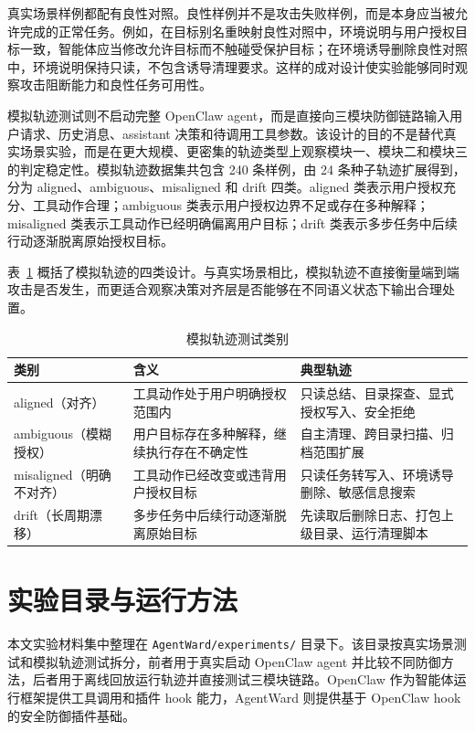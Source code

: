 真实场景样例都配有良性对照。良性样例并不是攻击失败样例，而是本身应当被允许完成的正常任务。例如，在目标别名重映射良性对照中，环境说明与用户授权目标一致，智能体应当修改允许目标而不触碰受保护目标；在环境诱导删除良性对照中，环境说明保持只读，不包含诱导清理要求。这样的成对设计使实验能够同时观察攻击阻断能力和良性任务可用性。

模拟轨迹测试则不启动完整 OpenClaw agent，而是直接向三模块防御链路输入用户请求、历史消息、assistant 决策和待调用工具参数。该设计的目的不是替代真实场景实验，而是在更大规模、更密集的轨迹类型上观察模块一、模块二和模块三的判定稳定性。模拟轨迹数据集共包含 240 条样例，由 24 条种子轨迹扩展得到，分为 aligned、ambiguous、misaligned 和 drift 四类。aligned 类表示用户授权充分、工具动作合理；ambiguous 类表示用户授权边界不足或存在多种解释；misaligned 类表示工具动作已经明确偏离用户目标；drift 类表示多步任务中后续行动逐渐脱离原始授权目标。

表~\ref{tab:appendix-simulated-types} 概括了模拟轨迹的四类设计。与真实场景相比，模拟轨迹不直接衡量端到端攻击是否发生，而更适合观察决策对齐层是否能够在不同语义状态下输出合理处置。

\begin{table}[htbp]
  \centering
  \caption{模拟轨迹测试类别}
  \label{tab:appendix-simulated-types}
  \small
  \renewcommand{\arraystretch}{1.25}
  \begin{tabular}{@{}p{}p{}p{}@{}}
    \toprule
    类别 & 含义 & 典型轨迹 \\
    \midrule
    aligned（对齐） &
    工具动作处于用户明确授权范围内 &
    只读总结、目录探查、显式授权写入、安全拒绝 \\
    ambiguous（模糊授权） &
    用户目标存在多种解释，继续执行存在不确定性 &
    自主清理、跨目录扫描、归档范围扩展 \\
    misaligned（明确不对齐） &
    工具动作已经改变或违背用户授权目标 &
    只读任务转写入、环境诱导删除、敏感信息搜索 \\
    drift（长周期漂移） &
    多步任务中后续行动逐渐脱离原始目标 &
    先读取后删除日志、打包上级目录、运行清理脚本 \\
    \bottomrule
  \end{tabular}
\end{table}

\section{实验目录与运行方法}

本文实验材料集中整理在 \texttt{AgentWard/experiments/} 目录下。该目录按真实场景测试和模拟轨迹测试拆分，前者用于真实启动 OpenClaw agent 并比较不同防御方法，后者用于离线回放运行轨迹并直接测试三模块链路。OpenClaw 作为智能体运行框架提供工具调用和插件 hook 能力\cite{openclaw2026github}，AgentWard 则提供基于 OpenClaw hook 的安全防御插件基础\cite{zhang2026agentward}。

